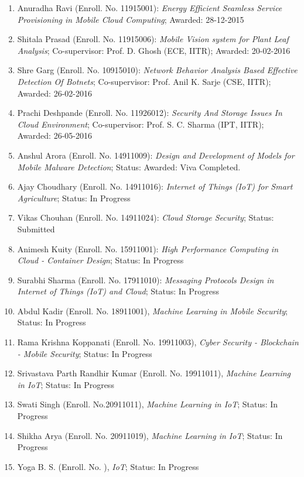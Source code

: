 \begin{enumerate} %
		\item Anuradha Ravi (Enroll. No. 11915001): \textit{Energy Efficient Seamless Service Provisioning in Mobile Cloud Computing}; Awarded: 28-12-2015
		\item Shitala Prasad (Enroll. No. 11915006): \textit{Mobile Vision system for Plant Leaf Analysis}; Co-supervisor: Prof. D. Ghosh (ECE, IITR); Awarded: 20-02-2016
		\item Shre Garg (Enroll. No. 10915010): \textit{Network Behavior Analysis Based Effective Detection Of Botnets}; Co-supervisor: Prof. Anil K. Sarje (CSE, IITR); Awarded: 26-02-2016
	\item Prachi Deshpande (Enroll. No. 11926012): \textit{Security And Storage Issues In Cloud Environment}; Co-supervisor: Prof. S. C. Sharma (IPT, IITR); Awarded: 26-05-2016
	\item Anshul Arora (Enroll. No. 14911009): \textit{Design and Development of Models for Mobile Malware Detection}; Status: Awarded: Viva Completed.
	\item Ajay Choudhary (Enroll. No. 14911016): \textit{Internet of Things (IoT) for Smart Agriculture}; Status: In Progress
	\item Vikas Chouhan (Enroll. No. 14911024): \textit{Cloud Storage Security}; Status: Submitted
	\item Animesh Kuity (Enroll. No. 15911001): \textit{High Performance Computing in Cloud - Container Design};	Status: In Progress	 	
	\item Surabhi Sharma (Enroll. No. 17911010): \textit{Messaging Protocols Design in Internet of Things (IoT) and Cloud}; Status: In Progress	
	\item Abdul Kadir (Enroll. No. 18911001), \textit{Machine Learning in Mobile Security}; Status: In Progress
	\item Rama Krishna Koppanati (Enroll. No. 19911003), \textit{Cyber Security - Blockchain - Mobile Security}; Status: In Progress
	\item Srivastava Parth Randhir Kumar (Enroll. No. 19911011), \textit{Machine Learning in IoT}; Status: In Progress
	\item Swati Singh (Enroll. No.20911011), \textit{Machine Learning in IoT}; Status: In Progress
	\item Shikha Arya (Enroll. No. 20911019), \textit{Machine Learning in IoT}; Status: In Progress
		\item Yoga B. S. (Enroll. No. ), \textit{IoT}; Status: In Progress
			\end{enumerate}